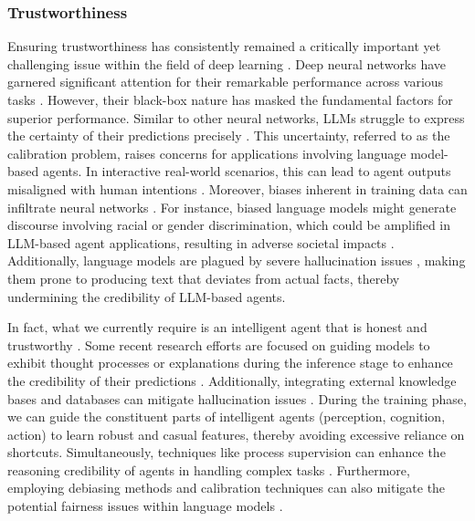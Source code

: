 \subsubsection{Trustworthiness}
Ensuring trustworthiness has consistently remained a critically important yet challenging issue within the field of deep learning \cite{DBLP:journals/corr/abs-2009-05835,DBLP:journals/csr/HuangKRSSTWY20,DBLP:journals/corr/abs-2305-11391}. Deep neural networks have garnered significant attention for their remarkable performance across various tasks \cite{DBLP:conf/nips/BrownMRSKDNSSAA20, DBLP:conf/naacl/DevlinCLT19, DBLP:journals/jmlr/RaffelSRLNMZLL20}. 
However, their black-box nature has masked the fundamental factors for superior performance. Similar to other neural networks, LLMs struggle to express the certainty of their predictions precisely \cite{DBLP:journals/corr/abs-2305-11391,DBLP:conf/acl/ChenYC0J23}. 
This uncertainty, referred to as the calibration problem, raises concerns for applications involving language model-based agents. In interactive real-world scenarios, this can lead to agent outputs misaligned with human intentions \cite{DBLP:journals/corr/abs-2304-08354}. 
Moreover, biases inherent in training data can infiltrate neural networks \cite{DBLP:conf/acl/BlodgettBDW20,DBLP:conf/aies/GuoC21}. 
For instance, biased language models might generate discourse involving racial or gender discrimination, which could be amplified in LLM-based agent applications, resulting in adverse societal impacts \cite{DBLP:conf/nips/BolukbasiCZSK16,caliskan2017semantics}. Additionally, language models are plagued by severe hallucination issues \cite{DBLP:journals/csur/JiLFYSXIBMF23,DBLP:journals/corr/abs-2305-15852}, making them prone to producing text that deviates from actual facts, thereby undermining the credibility of LLM-based agents.

In fact, what we currently require is an intelligent agent that is honest and trustworthy \cite{DBLP:journals/corr/abs-2112-00861, DBLP:conf/acl/MaynezNBM20}. 
Some recent research efforts are focused on guiding models to exhibit thought processes or explanations during the inference stage to enhance the credibility of their predictions \cite{DBLP:conf/nips/Wei0SBIXCLZ22,DBLP:conf/nips/KojimaGRMI22}. 
Additionally, integrating external knowledge bases and databases can mitigate hallucination issues \cite{DBLP:journals/corr/abs-2302-12813,DBLP:journals/corr/abs-2307-03987}. 
During the training phase, we can guide the constituent parts of intelligent agents (perception, cognition, action) to learn robust and casual features, thereby avoiding excessive reliance on shortcuts. Simultaneously, techniques like process supervision can enhance the reasoning credibility of agents in handling complex tasks \cite{DBLP:journals/corr/abs-2305-20050}. Furthermore, employing debiasing methods and calibration techniques can also mitigate the potential fairness issues within language models \cite{DBLP:conf/acl/GuoYA22,DBLP:journals/corr/abs-2208-11857}.


